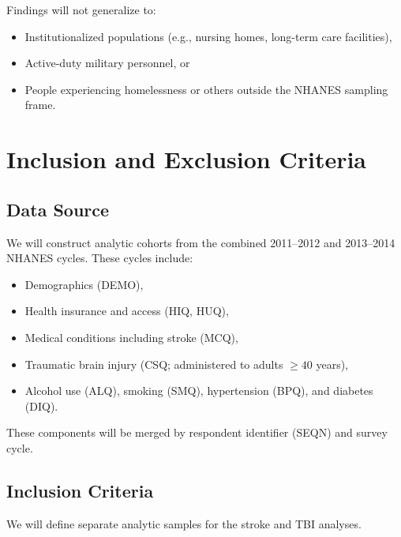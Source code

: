 \documentclass{article}
\begin{document}
Findings will not generalize to:

\begin{itemize}
    \item Institutionalized populations (e.g., nursing homes, long-term care facilities),

    \item Active-duty military personnel, or

    \item People experiencing homelessness or others outside the NHANES sampling frame.

\end{itemize}

\section{Inclusion and Exclusion Criteria}

\subsection{Data Source}

We will construct analytic cohorts from the combined 2011--2012 and 2013--2014 NHANES cycles. These cycles include:

\begin{itemize}
    \item Demographics (DEMO),

    \item Health insurance and access (HIQ, HUQ),

    \item Medical conditions including stroke (MCQ),

    \item Traumatic brain injury (CSQ; administered to adults $\geq 40$ years),

    \item Alcohol use (ALQ), smoking (SMQ), hypertension (BPQ), and diabetes (DIQ).

\end{itemize}

These components will be merged by respondent identifier (SEQN) and survey cycle.

\subsection{Inclusion Criteria}

We will define separate analytic samples for the stroke and TBI analyses.
\end{document}
